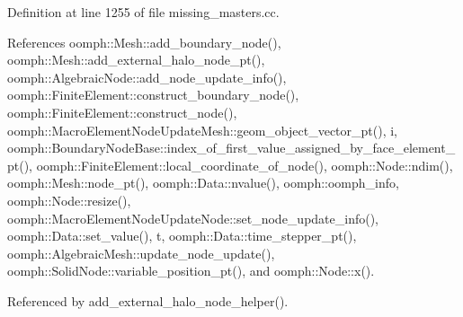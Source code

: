 Definition at line 1255 of file missing\+\_\+masters.\+cc.



References oomph\+::\+Mesh\+::add\+\_\+boundary\+\_\+node(), oomph\+::\+Mesh\+::add\+\_\+external\+\_\+halo\+\_\+node\+\_\+pt(), oomph\+::\+Algebraic\+Node\+::add\+\_\+node\+\_\+update\+\_\+info(), oomph\+::\+Finite\+Element\+::construct\+\_\+boundary\+\_\+node(), oomph\+::\+Finite\+Element\+::construct\+\_\+node(), oomph\+::\+Macro\+Element\+Node\+Update\+Mesh\+::geom\+\_\+object\+\_\+vector\+\_\+pt(), i, oomph\+::\+Boundary\+Node\+Base\+::index\+\_\+of\+\_\+first\+\_\+value\+\_\+assigned\+\_\+by\+\_\+face\+\_\+element\+\_\+pt(), oomph\+::\+Finite\+Element\+::local\+\_\+coordinate\+\_\+of\+\_\+node(), oomph\+::\+Node\+::ndim(), oomph\+::\+Mesh\+::node\+\_\+pt(), oomph\+::\+Data\+::nvalue(), oomph\+::oomph\+\_\+info, oomph\+::\+Node\+::resize(), oomph\+::\+Macro\+Element\+Node\+Update\+Node\+::set\+\_\+node\+\_\+update\+\_\+info(), oomph\+::\+Data\+::set\+\_\+value(), t, oomph\+::\+Data\+::time\+\_\+stepper\+\_\+pt(), oomph\+::\+Algebraic\+Mesh\+::update\+\_\+node\+\_\+update(), oomph\+::\+Solid\+Node\+::variable\+\_\+position\+\_\+pt(), and oomph\+::\+Node\+::x().



Referenced by add\+\_\+external\+\_\+halo\+\_\+node\+\_\+helper().

\mbox{\label{namespaceoomph_1_1Missing__masters__functions_a56eaf8c8da98960d9929a0c9921c4df7}} 
